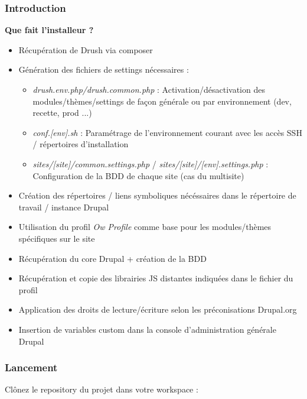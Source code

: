 \documentclass[a4paper,11pt,french]{rtdsphinxmanual}
\begin{document}
\subsubsection{Introduction}
\label{installation:introduction}
\textbf{Que fait l'installeur ?}
\begin{itemize}
\item {} 
Récupération de Drush via composer

\item {} 
Génération des fichiers de settings nécessaires :
\begin{itemize}
\item {} 
\emph{drush.env.php/drush.common.php} : Activation/désactivation des modules/thèmes/settings de façon générale ou par environnement (dev, recette, prod ...)

\item {} 
\emph{conf.{[}env{]}.sh} : Paramétrage de l'environnement courant avec les accès SSH / répertoires d'installation

\item {} 
\emph{sites/{[}site{]}/common.settings.php} / \emph{sites/{[}site{]}/{[}env{]}.settings.php} : Configuration de la BDD de chaque site (cas du multisite)

\end{itemize}

\item {} 
Création des répertoires / liens symboliques nécéssaires dans le répertoire de travail / instance Drupal

\item {} 
Utilisation du profil \emph{Ow Profile} comme base pour les modules/thèmes spécifiques sur le site

\item {} 
Récupération du core Drupal + création de la BDD

\item {} 
Récupération et copie des librairies JS distantes indiquées dans le fichier  du profil

\item {} 
Application des droits de lecture/écriture selon les préconisations Drupal.org

\item {} 
Insertion de variables custom dans la console d'administration générale Drupal

\end{itemize}


\subsubsection{Lancement}
\label{installation:lancement}
Clônez le repository du projet dans votre workspace :
\end{document}
